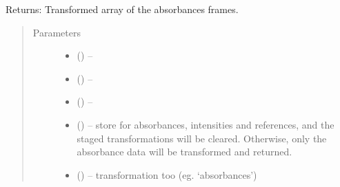 \documentclass[letterpaper,10pt,english]{sphinxmanual}
\begin{document}
\begin{fulllineitems}
\begin{fulllineitems}
Returns: Transformed array of the absorbances frames.
\begin{quote}\begin{description}
\item[{Parameters}] \leavevmode\begin{itemize}
\item {} 
 (\sphinxstyleliteralemphasis{-}) -- 

\item {} 
\sphinxstyleliteralstrong{, } (\sphinxstyleliteralemphasis{,}\sphinxstyleliteralemphasis{}) -- 

\item {} 
 () -- 

\item {} 
 (\sphinxstyleliteralemphasis{-}) -- store for absorbances, intensities and references, and the
staged transformations will be cleared. Otherwise, only the
absorbance data will be transformed and returned.

\item {} 
 (\sphinxstyleliteralemphasis{-}) -- transformation too (eg. `absorbances')

\end{itemize}

\end{description}\end{quote}

\end{fulllineitems}


\begin{fulllineitems}
\label{\detokenize{xanespy:xanespy.xanes_frameset.XanesFrameset.background_group}}
\end{fulllineitems}


\begin{fulllineitems}
\label{\detokenize{xanespy:xanespy.xanes_frameset.XanesFrameset.background_normalizer}}
\end{fulllineitems}


\end{fulllineitems}
\end{document}
